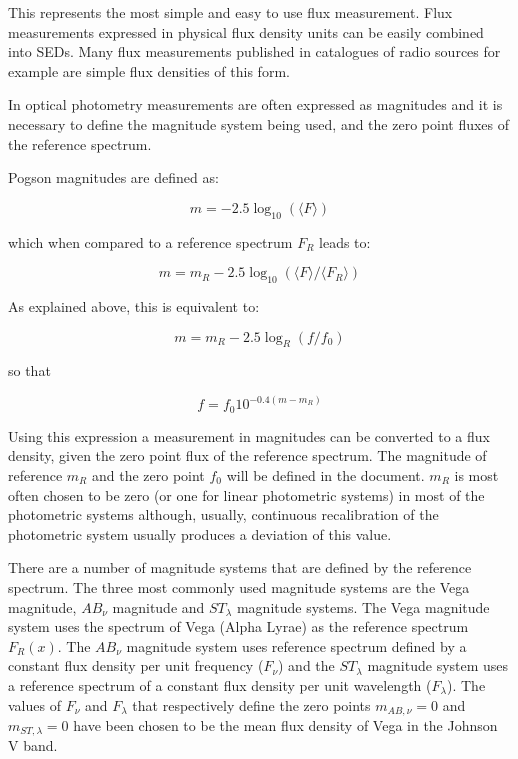 \documentclass[11pt,a4paper]{ivoa}
\begin{document}
This represents the most simple and easy to use flux measurement. Flux 
measurements expressed in physical flux density units can be easily combined 
into SEDs. Many flux measurements published in catalogues of radio sources 
for example are simple flux densities of this form.
\par

In optical photometry measurements are often expressed as magnitudes and it 
is necessary to define the magnitude system being used, and the zero point 
fluxes of the reference spectrum.
\par

Pogson magnitudes are defined as:

\begin{equation} \label{eq:4}
m = -2.5\log_{10} (\langle F\rangle ) 
\end{equation}

which when compared to a reference spectrum $F_R$ leads to:

\begin{equation} \label{eq:5}
m = m_R -2.5 \log_{10} \left(\langle F\rangle /\langle F_R \rangle \right) 
\end{equation}

As explained above, this is equivalent to:

\begin{equation} \label{eq:6}
m = m_R - 2.5 \log_{R} (f/f_0 )
\end{equation}


so that

\begin{equation} \label{eq:7}
f = f_0 10^{-0.4(m - m_{R})}
\end{equation}


Using this expression a measurement in magnitudes can be converted to a 
flux density, given the zero point flux of the reference spectrum.  The 
magnitude of reference $m_{R}$ and the zero point $f_0$ will be defined 
in the document. $m_{R}$ is most often chosen to be zero (or one for 
linear photometric systems) in most of the photometric systems although, 
usually, continuous recalibration of the photometric system usually 
produces a deviation of this value.
\par

There are a number of magnitude systems that are defined by the reference 
spectrum. The three most commonly used magnitude systems are the Vega 
magnitude, $AB_{\nu }$ magnitude and $ST_{\lambda }$ magnitude systems. 
The Vega magnitude system uses the spectrum of Vega (Alpha Lyrae) as the 
reference spectrum $F_R (x)$. The $AB_{\nu }$ magnitude system uses 
reference spectrum defined by a constant flux density per unit frequency 
($F_{\nu }$) and the
$ST_{\lambda }$ magnitude system uses a reference spectrum of a constant 
flux density per unit wavelength ($F_{\lambda }$). The values of $F_{\nu }$ 
and $F_{\lambda }$ that respectively define the zero points
$m_{AB,\nu } =0$ and
$m_{ST,\lambda } =0$ have been chosen to be the mean flux density of 
Vega in the Johnson V band.
\end{document}

